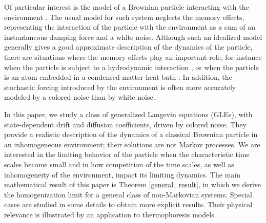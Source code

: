 Of particular interest is the model of a Brownian particle interacting with the environment  \cite{nelson1967dynamical}. The usual model for such system neglects the memory effects, representing the interaction of the particle with the environment as a sum of an instantaneous damping force and a white noise. Although such an idealized model generally gives a good approximate description of the dynamics of the particle, there are situations where the memory effects play an important role, for instance  when the particle is subject to a hydrodynamic interaction  \cite{franosch2011resonances}, or when the particle is an atom embedded in a condensed-matter heat bath \cite{Groblacher2015}.   In addition, the stochastic forcing introduced by the environment is often more accurately modeled by a colored noise than by white noise.  


In this paper, we study a class of generalized Langevin equations (GLEs), with state-dependent drift and diffusion coefficients, driven by colored noise.  They provide a realistic description of the dynamics of a classical Brownian particle in an inhomogeneous environment; their solutions are not Markov processes.  We are interested in the limiting behavior of the particle when the characteristic time scales become small and in how  competition of the time scales, as well as inhomogeneity of the environment, impact its limiting dynamics. The main mathematical result of this paper is Theorem \ref{general_result}, in which we derive the homogenization limit for a general class of non-Markovian systems. Special cases are studied in some details to obtain more explicit results. Their physical relevance is illustrated by an application to thermophoresis models.  

